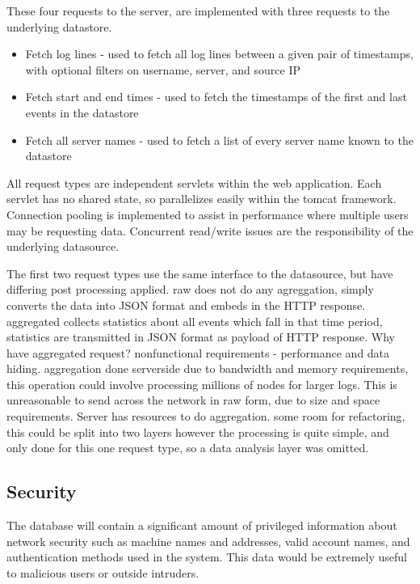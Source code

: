 These four requests to the server, are implemented with three requests to the underlying datastore.

\begin{itemize}
\item{Fetch log lines - used to fetch all log lines between a given pair of timestamps, with optional filters on username, server, and source IP}
\item{Fetch start and end times - used to fetch the timestamps of the first and last events in the datastore}
\item{Fetch all server names - used to fetch a list of every server name known to the datastore}
\end{itemize}

All request types are independent servlets within the web application. Each servlet has no shared state, so parallelizes easily within the tomcat framework. Connection pooling is implemented to assist in performance where multiple users may be requesting data. Concurrent read/write issues are the responsibility of the underlying datasource.

The first two request types use the same interface to the datasource, but have differing post processing applied. raw does not do any agreggation, simply converts the data into JSON format and embeds in the HTTP response. aggregated collects statistics about all events which fall in that time period, statistics are transmitted in JSON format as payload of HTTP response.
Why have aggregated request? nonfunctional requirements - performance and data hiding. aggregation done serverside due to bandwidth and memory requirements, this operation could involve processing millions of nodes for larger logs. This is unreasonable to send across the network in raw form, due to size and space requirements. Server has resources to do aggregation. 
some room for refactoring, this could be split into two layers
however the processing is quite simple, and only done for this one request type, so a data analysis layer was omitted.

\subsection{Security}

The database will contain a significant amount of privileged information about network security such as machine names and addresses, valid account names, and authentication methods used in the system. This data would be extremely useful to malicious users or outside intruders. 

